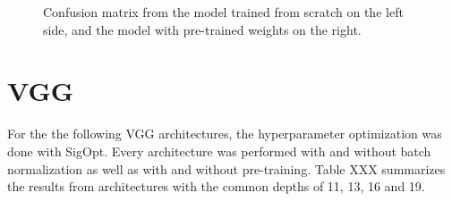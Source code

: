 \begin{figure}[h]
\centering
{}
\caption{Confusion matrix from the model trained from scratch on the left side, and the model with pre-trained weights on the right.}
\label{fig:alexnet-cm}
\end{figure}
















\section{VGG}

For the the following VGG architectures, the hyperparameter optimization was done with SigOpt. Every architecture was performed with and without batch normalization as well as with and without pre-training. Table XXX summarizes the results from architectures with the common depths of 11, 13, 16 and 19.

